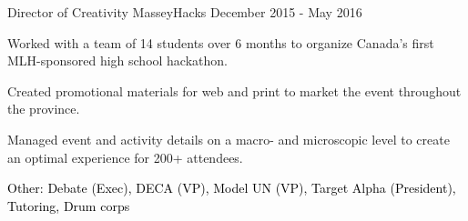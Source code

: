 \begin{cventries}
  \cventry
    {Director of Creativity}
    {MasseyHacks}
    {December 2015 - May 2016}
    {}
    {
      \begin{cvitems}
        \item {Worked with a team of 14 students over 6 months to organize Canada's first MLH-sponsored high school hackathon.}
        \item {Created promotional materials for web and print to market the event throughout the province.}
        \item {Managed event and activity details on a macro- and microscopic level to create an optimal experience for 200+ attendees.}
      \end{cvitems}
  		\vspace*{-2mm}
    }
  \cventry
    {\textcolor{black}{Other: Debate (Exec), DECA (VP), Model UN (VP), Target Alpha (President), Tutoring, Drum corps} }
    {}
    {}
    {}
    {}
\end{cventries}
\vspace*{-2mm}
